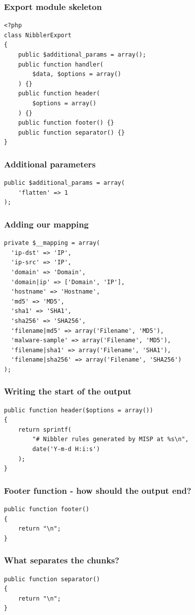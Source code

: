 \begin{frame}[fragile]
  \frametitle{Export module skeleton}
  \begin{lstlisting}
<?php
class NibblerExport
{
    public $additional_params = array();
    public function handler(
        $data, $options = array()
    ) {}
    public function header(
        $options = array()
    ) {}
    public function footer() {}
    public function separator() {}
}
  \end{lstlisting}
\end{frame}

\begin{frame}[fragile]
  \frametitle{Additional parameters}
  \begin{lstlisting}
public $additional_params = array(
    'flatten' => 1
);
  \end{lstlisting}
\end{frame}

\begin{frame}[fragile]
  \frametitle{Adding our mapping}
  \begin{lstlisting}
private $__mapping = array(
  'ip-dst' => 'IP',
  'ip-src' => 'IP',
  'domain' => 'Domain',
  'domain|ip' => ['Domain', 'IP'],
  'hostname' => 'Hostname',
  'md5' => 'MD5',
  'sha1' => 'SHA1',
  'sha256' => 'SHA256',
  'filename|md5' => array('Filename', 'MD5'),
  'malware-sample' => array('Filename', 'MD5'),
  'filename|sha1' => array('Filename', 'SHA1'),
  'filename|sha256' => array('Filename', 'SHA256')
);
  \end{lstlisting}
\end{frame}

\begin{frame}[fragile]
  \frametitle{Writing the start of the output}
  \begin{lstlisting}
public function header($options = array())
{
    return sprintf(
        "# Nibbler rules generated by MISP at %s\n",
        date('Y-m-d H:i:s')
    );
}
  \end{lstlisting}
\end{frame}

\begin{frame}[fragile]
  \frametitle{Footer function - how should the output end?}
  \begin{lstlisting}
public function footer()
{
    return "\n";
}
  \end{lstlisting}
\end{frame}

\begin{frame}[fragile]
  \frametitle{What separates the chunks?}
  \begin{lstlisting}
public function separator()
{
    return "\n";
}
  \end{lstlisting}
\end{frame}

